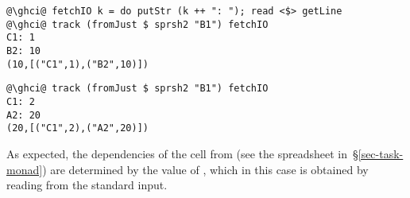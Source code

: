 \begin{verbatim}
@\ghci@ fetchIO k = do putStr (k ++ ": "); read <$> getLine
@\ghci@ track (fromJust $ sprsh2 "B1") fetchIO
C1: 1
B2: 10
(10,[("C1",1),("B2",10)])
\end{verbatim}
\vspace{1mm}
\begin{verbatim}
@\ghci@ track (fromJust $ sprsh2 "B1") fetchIO
C1: 2
A2: 20
(20,[("C1",2),("A2",20)])
\end{verbatim}
\vspace{1mm}

\noindent
As expected, the dependencies of the cell  from  (see the
spreadsheet in~\S\ref{sec-task-monad}) are determined by the value of ,
which in this case is obtained by reading from the standard input.
